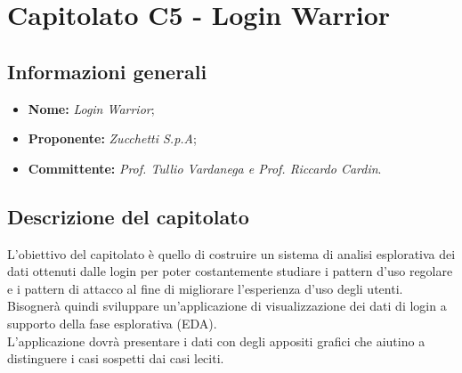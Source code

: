 \section{Capitolato C5 - Login Warrior}\label{section:c5}

\subsection{Informazioni generali}
    \begin {itemize}
        \item \textbf{Nome:} \textit{Login Warrior};
        \item \textbf{Proponente:} \textit{Zucchetti S.p.A};
        \item \textbf{Committente:} \textit{Prof. Tullio Vardanega e Prof. Riccardo Cardin}.
    \end{itemize}

\subsection{Descrizione del capitolato}
    L'obiettivo del capitolato è quello di costruire un sistema di analisi esplorativa dei dati ottenuti dalle login per poter costantemente studiare i pattern d'uso regolare e i pattern di attacco al fine di migliorare l'esperienza d'uso degli utenti.\\
    Bisognerà quindi sviluppare un'applicazione di visualizzazione dei dati di login a supporto della fase esplorativa (EDA\glo).\\
    L'applicazione dovrà presentare i dati con degli appositi grafici che aiutino a distinguere i casi sospetti dai casi leciti.

